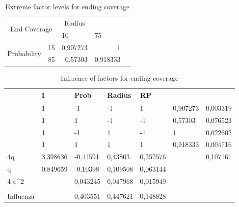 \begin{table}[H]
\centering
\begin{tabular}{|cl|r|r|l}
\cline{1-4}
\multicolumn{2}{|c|}{\multirow{2}{*}{End Coverage}}     & \multicolumn{1}{c|}{Radius} & \multicolumn{1}{c|}{}   &  \\ \cline{3-4}
\multicolumn{2}{|c|}{}                                  & \multicolumn{1}{l|}{10}     & \multicolumn{1}{l|}{75} &  \\ \cline{1-4}
\multicolumn{1}{|c|}{\multirow{2}{*}{Probability}} & 15 & 0,907273                    & 1                       &  \\ \cline{2-4}
\multicolumn{1}{|c|}{}                             & 85 & 0,57303                     & 0,918333                &  \\ \cline{1-4}
\end{tabular}
\caption{Extreme factor levels for ending coverage}
\label{tab:extreme-factors-end-coverage}
\end{table}

\begin{table}[H]
\centering
\begin{tabular}{|l|l|l|l|l|l|l|}
\hline
                       & I        & Prob     & Radius   & RP       &          &          \\ \hline
                       & 1        & -1       & -1       & 1        & 0,907273 & 0,003319 \\ \hline
                       & 1        & 1        & -1       & -1       & 0,57303  & 0,076523 \\ \hline
                       & 1        & -1       & 1        & -1       & 1        & 0,022602 \\ \hline
                       & 1        & 1        & 1        & 1        & 0,918333 & 0,004716 \\ \hline
4q                     & 3,398636 & -0,41591 & 0,43803  & 0,252576 &          & 0,107161 \\ \hline
q                      & 0,849659 & -0,10398 & 0,109508 & 0,063144 &          &          \\ \hline
4 q\textasciicircum{}2 &          & 0,043245 & 0,047968 & 0,015949 &          &          \\ \hline
                       &          &          &          &          &          &          \\ \hline
Influenza              &          & 0,403551 & 0,447621 & 0,148828 &          &          \\ \hline
\end{tabular}
\caption{Influence of factors for ending coverage}
\label{tab:influence-on-end-coverage}
\end{table}

